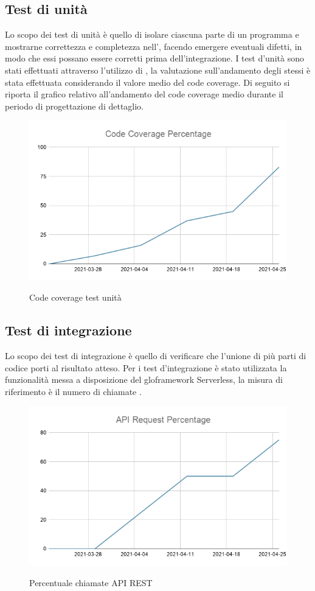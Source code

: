 \subsection{Test di unità}
Lo scopo dei test di unità è quello di isolare ciascuna parte di un programma e mostrarne correttezza e completezza nell', facendo emergere eventuali difetti, in modo che essi possano essere corretti prima dell'integrazione. I test d'unità sono stati effettuati attraverso l'utilizzo di , la valutazione sull'andamento degli stessi è stata effettuata considerando il valore medio del code coverage. Di seguito si riporta il grafico relativo all'andamento del code coverage medio durante il periodo di progettazione di dettaglio.
\begin{figure}[ht]
	\centering
	\includegraphics[scale=0.5]{Immagini/TestUnit}\\
	\caption{Code coverage test unità}
	\label{fig:CodeCoverage}
\end{figure}
\subsection{Test di integrazione}
Lo scopo dei test di integrazione è quello di verificare che l'unione di più parti di codice porti al risultato atteso. Per i test d'integrazione è stato utilizzata la funzionalità messa a disposizione del glo{framework} Serverless, la misura di riferimento è il numero di chiamate .
\begin{figure}[ht]
	\centering
	\includegraphics[scale=0.5]{Immagini/TestInteg}\\
	\caption{Percentuale chiamate API REST}
	\label{fig:ChiamateREST}
\end{figure}
